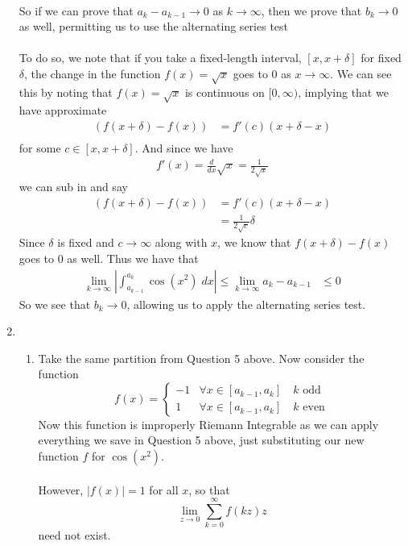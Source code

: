 \documentclass[12pt]{article}
\theoremstyle{plain}
\theoremstyle{definition}
\theoremstyle{remark}
\begin{document}
\begin{enumerate}
\begin{align*}
\end{align*}
So if we can prove that $a_k - a_{k-1} \rightarrow 0$ as $k\rightarrow \infty$, then we prove that $b_k\rightarrow0$ as well, permitting us to use the alternating series test
\\
\\
To do so, we note that if you take a fixed-length interval, $[x,x+\delta]$ for fixed $\delta$, the change in the function $f(x) = \sqrt{x}$ goes to 0 as $x\rightarrow\infty$. We can see this by noting that $f(x) = \sqrt{x}$ is continuous on $[0, \infty)$, implying that we have approximate
\begin{align*}
    (f(x+\delta) - f(x)) &= f'(c)(x+\delta - x)\\
\end{align*}
for some $c\in[x, x+\delta]$. And since we have
\begin{align*}
    f'(x) = \frac{d}{dx} \sqrt{x} = \frac{1}{2\sqrt{x}}
\end{align*}
we can sub in and say
\begin{align*}
    (f(x+\delta) - f(x)) &= f'(c)(x+\delta - x)\\
    &= \frac{1}{2\sqrt{c}} \delta
\end{align*}
Since $\delta$ is fixed and $c\rightarrow\infty$ along with $x$, we know that $f(x+\delta) - f(x)$ goes to 0 as well. Thus we have that
\begin{align*}
    \lim_{k\rightarrow\infty}\left\lvert \int^{a_k}_{a_{k-1}} \cos(x^2) \; dx \right\rvert \leq 
     \lim_{k\rightarrow\infty}   a_k - a_{k-1} 
        &\leq 0
\end{align*}
So we see that $b_k\rightarrow 0$, allowing us to apply the alternating series test.


\newpage
\item 
\begin{enumerate}

\item Take the same partition from Question 5 above.  Now consider the function 
    \[ f(x) = \begin{cases} -1 & \forall x \in [a_{k-1}, a_k] \quad \text{$k$ odd} \\
                             1 & \forall x \in [a_{k-1}, a_k] \quad \text{$k$ even} 
                \end{cases} \]
Now this function is improperly Riemann Integrable as we can apply everything we save in Question 5 above, just substituting our new function $f$ for $\cos(x^2)$.
\\
\\
However, $|f(x)| = 1$ for all $x$, so that 
    \[ \lim_{z\rightarrow 0} \sum^\infty_{k=0} f(kz) z \]
need not exist.


\end{enumerate}
\end{enumerate}
\end{document}
